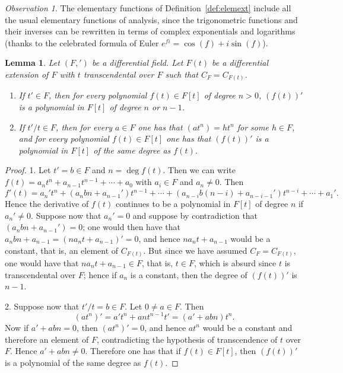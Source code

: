 \documentclass[11pt]{article}
\theoremstyle{plain}
\newtheorem{lemma}{Lemma}
\theoremstyle{definition}
\theoremstyle{remark}
\newtheorem*{observation}{Observation}
\renewcommand{\deg}{\operatorname{deg}}
\begin{document}
\begin{observation}
The elementary functions of Definition~\ref{def:elemext} include all
the usual elementary functions of analysis, since the trigonometric
functions and their inverses can be rewritten in terms of complex
exponentials and logarithms (thanks to the celebrated formula of Euler
$e^{fi} = \cos(f) + i \sin(f)$).
\end{observation}

\begin{lemma}\label{lem:degree}
Let $(F, ')$ be a differential field. Let $F(t)$ be a differential
extension of $F$ with $t$ transcendental over $F$ such that
$C_{F} = C_{F(t)}$.
\begin{enumerate}
\item If $t' \in F$, then for every polynomial $f(t) \in F[t]$ of
degree $n > 0$, $(f(t))'$ is a polynomial in $F[t]$ of degree $n$ or
$n-1$.
\item If $t'/t \in F$, then for every $a \in F$ one has that
$(a t^{n}) = h t^{n}$ for some $h \in F$, and for every polynomial
$f(t) \in F[t]$ one has that $(f(t))'$ is a polynomial in $F[t]$ of the
same degree as $f(t)$.
\end{enumerate}
\end{lemma}

\begin{proof}
1. Let $t' = b \in F$ and $n = \deg f(t)$. Then we can write
$f(t) = a_{n} t^{n} + a_{n-1} t^{n-1} + \cdots + a_{0}$ with
$a_{i} \in F$ and $a_{n} \neq 0$. Then
\[
f'(t) = a_{n}' t^{n} + (a_{n} b n + a_{n-1}') t^{n-1} + \cdots
+ (a_{n-i} b (n-i) + a_{n-i-1}') t^{n-i} + \cdots + a_{1}'.
\]
Hence the derivative of $f(t)$ continues to be a polynomial in $F[t]$
of degree $n$ if $a_{n}' \neq 0$. Suppose now that $a_{n}' = 0$ and
suppose by contradiction that $(a_{n} b n + a_{n-1}') = 0$; one would
then have that $a_{n} b n + a_{n-1} = (n a_{n} t + a_{n-1})' = 0$, and
hence $n a_{n} t + a_{n-1}$ would be a constant, that is, an element of
$C_{F(t)}$. But since we have assumed $C_{F} = C_{F(t)}$, one would
have that $n a_{n} t + a_{n-1} \in F$, that is, $t \in F$, which is
absurd since $t$ is transcendental over $F$; hence if $a_{n}$ is a
constant, then the degree of $(f(t))'$ is $n-1$.

2. Suppose now that $t'/t = b \in F$. Let $0 \neq a \in F$. Then
\[
(a t^{n})' = a' t^{n} + a n t^{n-1} t' = (a' + a b n) t^{n}.
\]
Now if $a' + a b n = 0$, then $(a t^{n})' = 0$, and hence $a t^{n}$
would be a constant and therefore an element of $F$, contradicting the
hypothesis of transcendence of $t$ over $F$. Hence $a' + a b n \neq 0$.
Therefore one has that if $f(t) \in F[t]$, then $(f(t))'$ is a
polynomial of the same degree as $f(t)$.
\end{proof}
\end{document}
